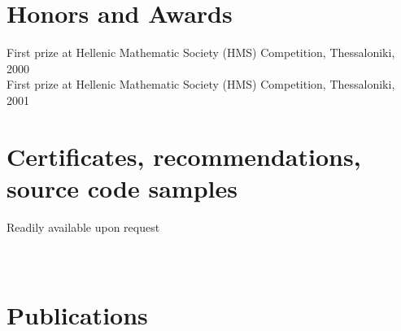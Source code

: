 \documentclass[margin,line]{res}
\begin{document}
\begin{resume}
\section{\sc Honors and Awards}
First prize at Hellenic Mathematic Society (HMS) Competition, Thessaloniki, 2000\\
First prize at Hellenic Mathematic Society (HMS) Competition, Thessaloniki, 2001

\section{\sc Certificates, recommendations, source code samples}
Readily available upon request\\\\\\

\section{\sc Publications}
\renewcommand\refname{}
\nocite{*}


\end{resume}
\end{document}
